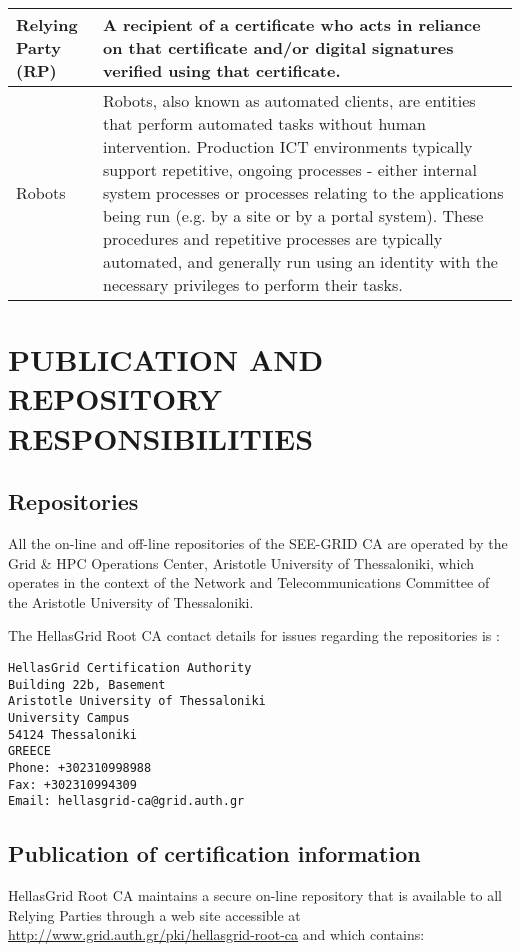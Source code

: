 \documentclass[11pt,a4paper,titlepage]{book}
\begin{document}
\begin{tabular}{|p{}|p{}|}
\hline
Relying Party (RP) & 
A recipient of a certificate who acts in reliance on that certificate and/or digital signatures verified using that certificate. \\
\hline
Robots &
Robots, also known as automated clients, are entities that perform automated tasks without human intervention. Production ICT environments typically support repetitive, ongoing processes - either internal system processes or processes relating to the applications being run (e.g. by a site or by a portal system). These procedures and repetitive processes are typically automated, and generally run using an identity with the necessary privileges to perform their tasks. \\
\hline
\end{tabular}

\chapter{PUBLICATION AND REPOSITORY RESPONSIBILITIES}
\section{Repositories}

All the on-line and off-line repositories of the SEE-GRID CA are operated by the Grid \& HPC Operations Center, Aristotle University of Thessaloniki, which operates in the context of the Network and Telecommunications Committee of the Aristotle University of Thessaloniki.

The HellasGrid Root CA contact details for issues regarding the repositories is :

\begin{verbatim}
HellasGrid Certification Authority
Building 22b, Basement
Aristotle University of Thessaloniki
University Campus
54124 Thessaloniki
GREECE
Phone: +302310998988
Fax: +302310994309
Email: hellasgrid-ca@grid.auth.gr
\end{verbatim}

\section{Publication of certification information}

HellasGrid Root CA maintains a secure on-line repository that is available to all Relying Parties through a web site accessible at \href{http://www.grid.auth.gr/pki/hellasgrid-root-ca}{http://www.grid.auth.gr/pki/hellasgrid-root-ca} and which contains:
\end{document}
